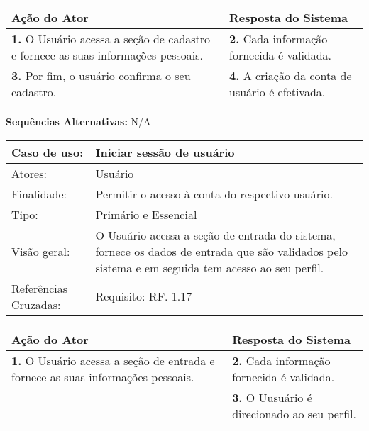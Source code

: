 \documentclass[12pt,a4paper,onecolumn,titlepage]{article}
\begin{document}
\begin{center}
\def\arraystretch{1.1}
\begin{tabular}{|p{6cm}|p{6cm}|}

\hline
\textbf{Ação do Ator} & \textbf{Resposta do Sistema} \\ \hline
\textbf{1.} O Usuário acessa a seção de cadastro e fornece as suas informações pessoais. & \textbf{2.} Cada informação fornecida é validada. \\ \hline
\textbf{3.} Por fim, o usuário confirma o seu cadastro. & \textbf{4.} A criação da conta de usuário é efetivada. \\ \hline
\end{tabular}
\end{center}

\textbf{Sequências Alternativas:} N/A

\newpage

\begin{table}[h!]
\begin{center}
\begin{tabular}{p{2.5cm} p{9.5cm}}
Caso de uso: & \textbf{Iniciar sessão de usuário} \\ \hline
Atores: & Usuário \\ \hline
Finalidade: & Permitir o acesso à conta do respectivo usuário. \\ \hline
Tipo: & Primário e Essencial \\ \hline
Visão geral: & O Usuário acessa a seção de entrada do sistema, fornece os dados de entrada que são validados pelo sistema e em seguida tem acesso ao seu perfil. \\ \hline
Referências Cruzadas: & Requisito: RF. 1.17

\end{tabular}
\end{center}
\end{table}

\begin{center}
\def\arraystretch{1.1}
\begin{tabular}{|p{6cm}|p{6cm}|}

\hline
\textbf{Ação do Ator} & \textbf{Resposta do Sistema} \\ \hline
\textbf{1.} O Usuário acessa a seção de entrada e fornece as suas informações pessoais. & \textbf{2.} Cada informação fornecida é validada. \\ \hline
 & \textbf{3.} O Uusuário é direcionado ao seu perfil. \\ \hline
\end{tabular}
\end{center}
\end{document}
